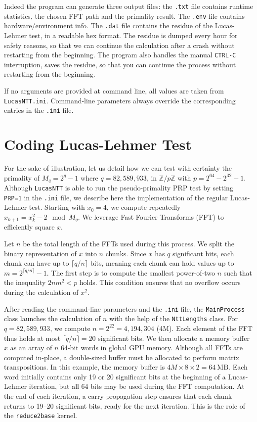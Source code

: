 \documentclass{article}
\begin{document}
Indeed the program can generate three output files: the \texttt{.txt} file contains runtime statistics, the chosen FFT path and the primality result. The \texttt{.env} file contains hardware/environment info. The \texttt{.dat} file contains the residue of the Lucas-Lehmer test, in a readable hex format. The residue is dumped every hour for safety reasons, so that we can continue the calculation after a crash without restarting from the beginning. The program also handles the manual \texttt{CTRL-C} interruption, saves the residue, so that you can continue the process without restarting from the beginning.

If no arguments are provided at command line, all values are taken from \texttt{LucasNTT.ini}. Command-line parameters always override the corresponding entries in the \texttt{.ini} file.

\section{Coding Lucas-Lehmer Test}

For the sake of illustration, let us detail how we can test with certainty the primality of $M_q = 2^q - 1$ where $q = 82,\!589,\!933$, in $\mathbb{Z}/p\mathbb{Z}$ with $p = 2^{64} - 2^{32} + 1$. Although \texttt{LucasNTT} is able to run the pseudo-primality PRP test by setting \texttt{PRP=1} in the \texttt{.ini} file, we describe here the implementation of the regular Lucas-Lehmer test. Starting with $x_0 = 4$, we compute repeatedly
$x_{k+1} = x_k^2 - 2 \mod M_q$.
We leverage Fast Fourier Transforms (FFT) to efficiently square $x$.

Let $n$ be the total length of the FFTs used during this process. We split the binary representation of $x$ into $n$ chunks. Since $x$ has $q$ significant bits, each chunk can have up to $\lceil q / n \rceil$ bits, meaning each chunk can hold values up to
$m = 2^{\lceil q / n \rceil} - 1$.
The first step is to compute the smallest power-of-two $n$ such that the inequality
$2nm^2 < p$
holds. This condition ensures that no overflow occurs during the calculation of $x^2$.

After reading the command-line parameters and the \texttt{.ini} file, the \texttt{MainProcess} class launches the calculation of $n$ with the help of the \texttt{NttLengths} class. For $q = 82,\!589,\!933$, we compute $n = 2^{22} = 4,\!194,\!304$ (4M). Each element of the FFT thus holds at most
$\lceil q / n \rceil = 20$
significant bits. We then allocate a memory buffer $x$ as an array of $n$ 64-bit words in global GPU memory. Although all FFTs are computed in-place, a double-sized buffer must be allocated to perform matrix transpositions. In this example, the memory buffer is
$4M \times 8 \times 2 = 64\ \text{MB}$.
Each word initially contains only 19 or 20 significant bits at the beginning of a Lucas-Lehmer iteration, but all 64 bits may be used during the FFT computation. At the end of each iteration, a carry-propagation step ensures that each chunk returns to 19--20 significant bits, ready for the next iteration. This is the role of the \texttt{reduce2base} kernel.
\end{document}

